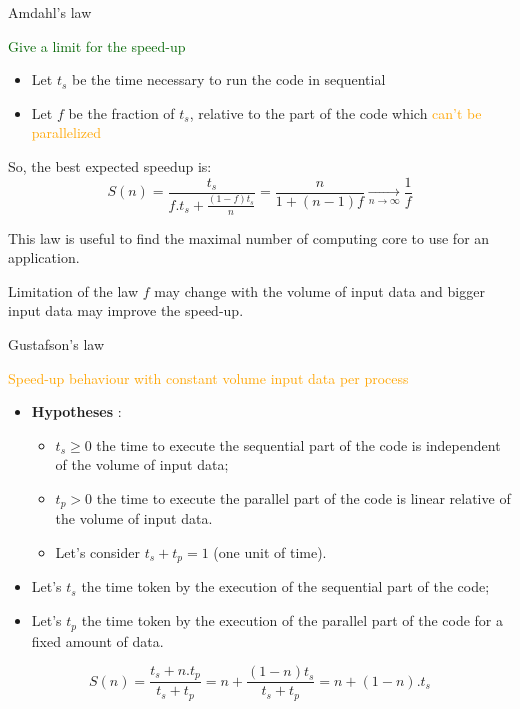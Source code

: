 \documentclass[compress,10pt,aspectratio=169]{beamer}
\begin{document}
\begin{frame}[fragile]{Amdahl's law}
\scriptsize
\begin{center}\textcolor{DarkGreen}{\large Give a limit for the speed-up}\end{center}

\begin{itemize}
\item Let $t_{s}$ be the time necessary to run the code in sequential
\item Let $f$ be the fraction of $t_{s}$, relative to the part of the code which \textcolor{orange}{can't be parallelized}
\end{itemize}

So, the best expected speedup is:
\[
    S(n) = \frac{t_{s}}{f.t_{s}+\frac{(1-f)t_{s}}{n}} = \frac{n}{1+(n-1)f} \xrightarrow[n \to \infty]{} \frac{1}{f}
\]

This law is useful to find the maximal number of computing core to use for an application.

\begin{alertblock}{Limitation of the law}
    $f$ may change with the volume of input data and bigger input data may improve the speed-up.
\end{alertblock}
\end{frame}

\begin{frame}[fragile]{Gustafson's law}
\scriptsize
\begin{center}{\large \textcolor{orange}{Speed-up behaviour with constant volume input data per process}}\end{center}

\begin{itemize}
\item \textbf{Hypotheses} : 
\begin{itemize}
    \item {\scriptsize $t_{s}\geq 0$ the time to execute the sequential part of the code is independent of the volume of input data;}
    \item {\scriptsize $t_{p} > 0$ the time to execute the parallel part of the code is linear relative of the volume of input data.}
    \item {\scriptsize Let's consider $t_{s}+t_{p} = 1$ (one unit of time)}.
\end{itemize}
\item Let's $t_{s}$ the time token by the execution of the sequential part of the code;
\item Let's $t_{p}$ the time token by the execution of the parallel part of the code for a fixed amount of data.
\end{itemize}

\[
    S(n) = \frac{t_{s}+n.t_{p}}{t_{s}+t_{p}} = n + \frac{(1-n)t_{s}}{t_{s}+t_{p}}
                                             = n + (1-n).t_{s}
\]
\end{frame}
\end{document}
